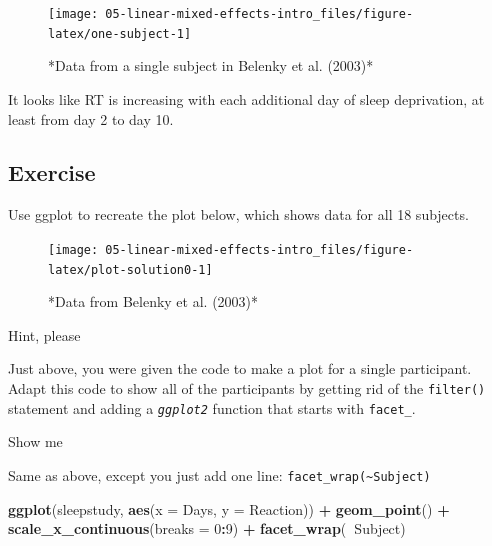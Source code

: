 \documentclass[]{book}
\newenvironment{Shaded}{\begin{snugshade}}{\end{snugshade}}
\newcommand{\DataTypeTok}[1]{\textcolor[rgb]{0.13,0.29,0.53}{#1}}
\newcommand{\DecValTok}[1]{\textcolor[rgb]{0.00,0.00,0.81}{#1}}
\newcommand{\KeywordTok}[1]{\textcolor[rgb]{0.13,0.29,0.53}{\textbf{#1}}}
\newcommand{\NormalTok}[1]{#1}
\newcommand{\OperatorTok}[1]{\textcolor[rgb]{0.81,0.36,0.00}{\textbf{#1}}}
\newcommand{\StringTok}[1]{\textcolor[rgb]{0.31,0.60,0.02}{#1}}
\begin{document}
\begin{figure}

{\centering \texttt{[image: 05-linear-mixed-effects-intro\_files/figure-latex/one-subject-1]} 

}

\caption{*Data from a single subject in Belenky et al. (2003)*}\label{fig:one-subject}
\end{figure}

It looks like RT is increasing with each additional day of sleep deprivation, at least from day 2 to day 10.

\hypertarget{exercise}{%
\subsection*{Exercise}\label{exercise}}

Use ggplot to recreate the plot below, which shows data for all 18 subjects.

\begin{figure}

{\centering \texttt{[image: 05-linear-mixed-effects-intro\_files/figure-latex/plot-solution0-1]} 

}

\caption{*Data from Belenky et al. (2003)*}\label{fig:plot-solution0}
\end{figure}

Hint, please

Just above, you were given the code to make a plot for a single participant. Adapt this code to show all of the participants by getting rid of the \texttt{filter()} statement and adding a \emph{\texttt{ggplot2}} function that starts with \texttt{facet\_}.

Show me

Same as above, except you just add one line: \texttt{facet\_wrap(\textasciitilde{}Subject)}

\begin{Shaded}
\begin{Highlighting}[]
\KeywordTok{ggplot}\NormalTok{(sleepstudy, }\KeywordTok{aes}\NormalTok{(}\DataTypeTok{x =}\NormalTok{ Days, }\DataTypeTok{y =}\NormalTok{ Reaction)) }\OperatorTok{+}
\StringTok{  }\KeywordTok{geom_point}\NormalTok{() }\OperatorTok{+}
\StringTok{  }\KeywordTok{scale_x_continuous}\NormalTok{(}\DataTypeTok{breaks =} \DecValTok{0}\OperatorTok{:}\DecValTok{9}\NormalTok{) }\OperatorTok{+}
\StringTok{  }\KeywordTok{facet_wrap}\NormalTok{(}\OperatorTok{~}\NormalTok{Subject)}
\end{Highlighting}
\end{Shaded}
\end{document}
